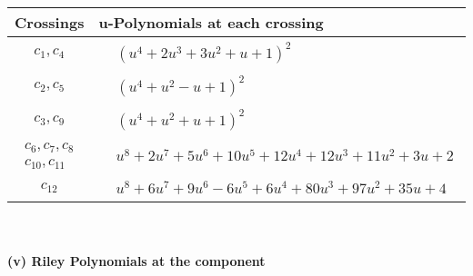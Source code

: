 \documentclass[1p]{elsarticle_modified}
\theoremstyle{definition}
\begin{document}
\begin{tabular}{m{50pt}|m{274pt}}
Crossings & \hspace{64pt}u-Polynomials at each crossing \\
\hline $$\begin{aligned}c_{1},c_{4}\end{aligned}$$&$\begin{aligned}
&(u^4+2 u^3+3 u^2+u+1)^2
\end{aligned}$\\
\hline $$\begin{aligned}c_{2},c_{5}\end{aligned}$$&$\begin{aligned}
&(u^4+u^2- u+1)^2
\end{aligned}$\\
\hline $$\begin{aligned}c_{3},c_{9}\end{aligned}$$&$\begin{aligned}
&(u^4+u^2+u+1)^2
\end{aligned}$\\
\hline $$\begin{aligned}c_{6},c_{7},c_{8}\\c_{10},c_{11}\end{aligned}$$&$\begin{aligned}
&u^8+2 u^7+5 u^6+10 u^5+12 u^4+12 u^3+11 u^2+3 u+2
\end{aligned}$\\
\hline $$\begin{aligned}c_{12}\end{aligned}$$&$\begin{aligned}
&u^8+6 u^7+9 u^6-6 u^5+6 u^4+80 u^3+97 u^2+35 u+4
\end{aligned}$\\
\hline
\end{tabular}\\~\\
\newpage\renewcommand{\arraystretch}{1}
\flushleft \textbf{(v) Riley Polynomials at the component}\newline \\
\end{document}
